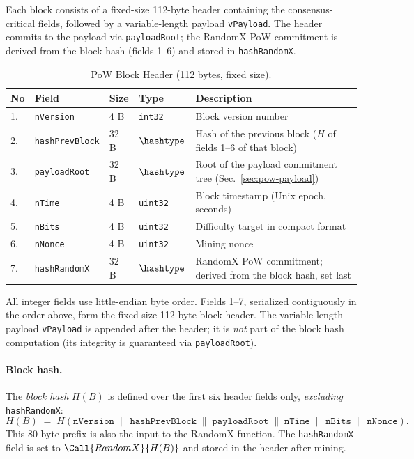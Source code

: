 Each block consists of a fixed-size 112-byte header containing the consensus-critical fields, followed by a variable-length payload \texttt{vPayload}. The header commits to the payload via \texttt{payloadRoot}; the RandomX PoW commitment is derived from the block hash (fields 1--6) and stored in \texttt{hashRandomX}.

\begin{table}[!htbp]
  \begin{center}
    \caption{PoW Block Header (112 bytes, fixed size).}\label{ta:pow-block}
    \begin{tabular}{|p{0.5cm}|p{3cm}|p{1.5cm}|p{1.4cm}|p{7cm}|}\hline
      No & Field & Size & Type & Description \\\hline\hline
      1. & \texttt{nVersion}       & 4 B  & \texttt{int32}   & Block version number \\\hline
      2. & \texttt{hashPrevBlock}  & 32 B & $\hashtype$      & Hash of the previous block ($H$ of fields 1--6 of that block) \\\hline
      3. & \texttt{payloadRoot}    & 32 B & $\hashtype$      & Root of the payload commitment tree (Sec.~\ref{sec:pow-payload}) \\\hline
      4. & \texttt{nTime}          & 4 B  & \texttt{uint32}  & Block timestamp (Unix epoch, seconds) \\\hline
      5. & \texttt{nBits}          & 4 B  & \texttt{uint32}  & Difficulty target in compact format \\\hline
      6. & \texttt{nNonce}         & 4 B  & \texttt{uint32}  & Mining nonce \\\hline
      7. & \texttt{hashRandomX}    & 32 B & $\hashtype$      & RandomX PoW commitment; derived from the block hash, set last \\\hline
    \end{tabular}
  \end{center}
\end{table}

All integer fields use little-endian byte order. Fields 1--7, serialized contiguously in the order above, form the fixed-size 112-byte block header. The variable-length payload \texttt{vPayload} is appended after the header; it is \emph{not} part of the block hash computation (its integrity is guaranteed via \texttt{payloadRoot}).

\paragraph{Block hash.} The \emph{block hash} $H(B)$ is defined over the first six header fields only, \emph{excluding} \texttt{hashRandomX}:
\[
  H(B) \;=\; H\!\left(\texttt{nVersion} \;\|\; \texttt{hashPrevBlock} \;\|\; \texttt{payloadRoot} \;\|\; \texttt{nTime} \;\|\; \texttt{nBits} \;\|\; \texttt{nNonce}\right).
\]
This 80-byte prefix is also the input to the RandomX function. The \texttt{hashRandomX} field is set to $\Call{RandomX}{H(B)}$ and stored in the header after mining.

